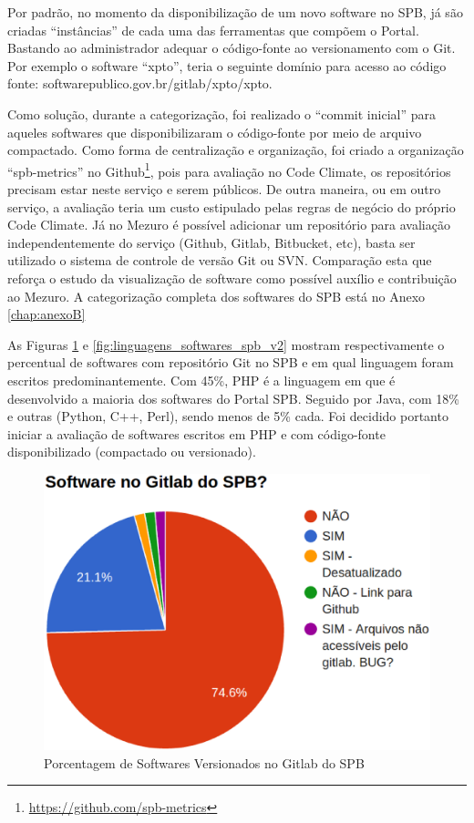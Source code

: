 Por padrão, no momento da disponibilização de um novo software no SPB, já são
criadas ``instâncias'' de cada uma das ferramentas que compõem o Portal. Bastando
ao administrador adequar o código-fonte ao versionamento com o Git. Por exemplo
o software ``xpto'', teria o seguinte domínio para acesso ao código fonte:
softwarepublico.gov.br/gitlab/xpto/xpto.

Como solução, durante a categorização, foi realizado o ``commit inicial'' para
aqueles softwares que disponibilizaram o código-fonte por meio de arquivo
compactado. Como forma de centralização e organização, foi criado a organização
``spb-metrics'' no Github\footnote{\url{https://github.com/spb-metrics}}, pois
para avaliação no Code Climate, os repositórios precisam estar neste serviço e
serem públicos. De outra maneira, ou em outro serviço, a avaliação teria um
custo estipulado pelas regras de negócio do próprio Code Climate. Já no Mezuro é
possível adicionar um repositório para avaliação independentemente do serviço
(Github, Gitlab, Bitbucket, etc), basta ser utilizado o sistema de controle de
versão Git ou SVN. Comparação esta que reforça o estudo da visualização de
software como possível auxílio e contribuição ao Mezuro. A categorização
completa dos softwares do SPB está no Anexo \ref{chap:anexoB}

As Figuras \ref{fig:is_software_gitlab_spb} e \ref{fig:linguagens_softwares_spb_v2}
mostram respectivamente o percentual de softwares com repositório Git no SPB e
em qual linguagem foram escritos predominantemente. Com 45\%, PHP é a linguagem
em que é desenvolvido a maioria dos softwares do Portal SPB. Seguido por Java,
com 18\% e outras (Python, C++, Perl), sendo menos de 5\% cada. Foi decidido
portanto iniciar a avaliação de softwares escritos em PHP e com código-fonte
disponibilizado (compactado ou versionado).

\begin{figure}[!htb]
	\centering
    \includegraphics[keepaspectratio=true,scale=0.5]
    {figuras/is_software_gitlab_spb.eps}
  \caption{Porcentagem de Softwares Versionados no Gitlab do SPB}
  \label{fig:is_software_gitlab_spb}
\end{figure}

